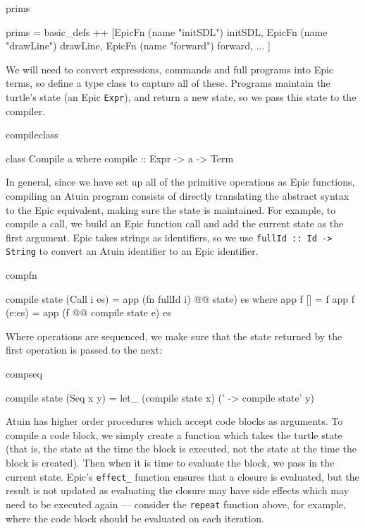 \begin{SaveVerbatim}{prims}

prims = basic_defs ++
        [EpicFn (name "initSDL") initSDL,
         EpicFn (name "drawLine") drawLine,
         EpicFn (name "forward") forward, ... ]

\end{SaveVerbatim}

\noindent
We will need to convert expressions, commands and full programs into
Epic terms, so define a type class to capture all of these. Programs
maintain the turtle's state (an Epic \texttt{Expr}), and return a new
state, so we pass this state to the compiler.

\begin{SaveVerbatim}{compileclass}

class Compile a where
    compile :: Expr -> a -> Term

\end{SaveVerbatim}

In general, since we have set up all of the primitive operations as
Epic functions, compiling an Atuin program consists of directly
translating the abstract syntax to the Epic equivalent, making sure
the state is maintained. For example, to compile a call, we
build an Epic function call and add the current state as the first
argument. Epic takes strings as identifiers, so we use \texttt{fullId
  :: Id -> String} to convert an Atuin identifier to an Epic identifier.

\begin{SaveVerbatim}{compfn}

compile state (Call i es) 
     = app (fn fullId i) @@ state) es
   where app f [] = f
         app f (e:es) = app (f @@ compile state e) es

\end{SaveVerbatim}

\noindent
Where operations are sequenced, we make sure that the state returned
by the first operation is passed to the next:

\begin{SaveVerbatim}{compseq}

compile state (Seq x y) 
   = let_ (compile state x) (\state' -> compile state' y)

\end{SaveVerbatim}

Atuin has higher order procedures which accept code blocks as
arguments. To compile a code block, we simply create a function which
takes the turtle state (that is, the state at the time the block is
executed, not the state at the time the block is created). Then when
it is time to evaluate the block, we pass in the current state. Epic's
\texttt{effect\_} function ensures that a closure is evaluated, but
the result is not updated as evaluating the closure may have side
effects which may need to be executed again --- consider the
\texttt{repeat} function above, for example, where the code block
should be evaluated on each iteration.

